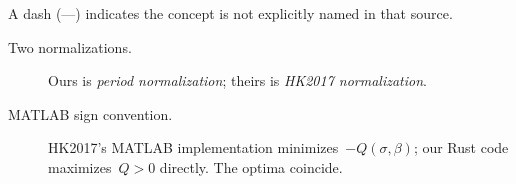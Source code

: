 A dash (---) indicates the concept is not explicitly named in that source.



\begin{description}

\item[Two normalizations.]
  Ours is \emph{period normalization};
  theirs is \emph{HK2017 normalization}.

\item[MATLAB sign convention.]
  HK2017's MATLAB implementation minimizes~$-Q(\sigma,\beta)$; our Rust code maximizes~$Q > 0$ directly. The optima coincide.

\end{description}
